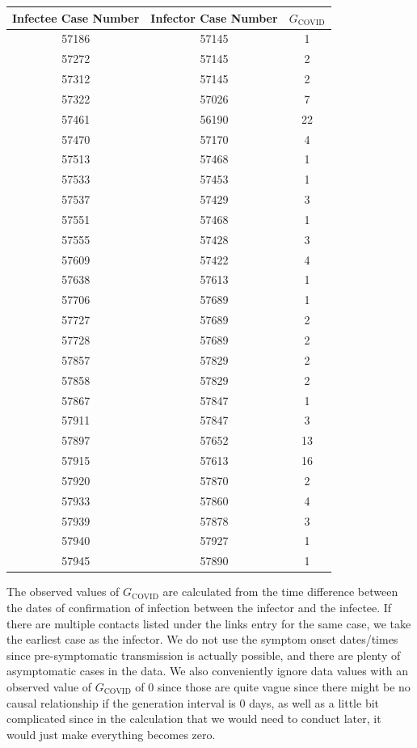 \documentclass[11pt,fancychapters]{article}
\begin{document}
\begin{center}
\begin{tabular}{ ||c|c|c|| } 
\hline
Infectee Case Number & Infector Case Number & $G_\text{COVID}$ \\ 
\hline\hline
57186 & 57145 & 1 \\
\hline
57272 & 57145 & 2 \\
\hline
57312 & 57145 & 2 \\
\hline
57322 & 57026 & 7 \\
\hline
57461 & 56190 & 22 \\
\hline
57470 & 57170 & 4 \\
\hline
57513 & 57468 & 1 \\
\hline
57533 & 57453 & 1 \\
\hline
57537 & 57429 & 3 \\
\hline
57551 & 57468 & 1 \\
\hline
57555 & 57428 & 3 \\
\hline
57609 & 57422 & 4 \\
\hline
57638 & 57613 & 1 \\
\hline
57706 & 57689 & 1 \\
\hline
57727 & 57689 & 2 \\
\hline
57728 & 57689 & 2 \\
\hline
57857 & 57829 & 2 \\
\hline
57858 & 57829 & 2 \\
\hline
57867 & 57847 & 1 \\
\hline
57911 & 57847 & 3 \\
\hline
57897 & 57652 & 13 \\
\hline
57915 & 57613 & 16 \\
\hline
57920 & 57870 & 2 \\
\hline
57933 & 57860 & 4 \\
\hline
57939 & 57878 & 3 \\
\hline
57940 & 57927 & 1 \\
\hline
57945 & 57890 & 1 \\
\hline
\end{tabular}
\end{center}

The observed values of $G_\text{COVID}$ are calculated from the time difference between the dates of confirmation of infection between the infector and the infectee. If there are multiple contacts listed under the links entry for the same case, we take the earliest case as the infector. We do not use the symptom onset dates/times since pre-symptomatic transmission is actually possible, and there are plenty of asymptomatic cases in the data. We also conveniently ignore data values with an observed value of $G_\text{COVID}$ of $0$ since those are quite vague since there might be no causal relationship if the generation interval is $0$ days, as well as a little bit complicated since in the calculation that we would need to conduct later, it would just make everything becomes zero.
\end{document}
